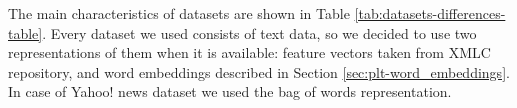 \documentclass{article}
\newcommand{\Algo}[1]{\textsc{#1}}
\newcommand{\data}[3]{
    \begin{tabular}{ll}
    \rule{0pt}{0pt} #1 \\
    \rule{0pt}{0pt} #2 \\
    \rule{0pt}{0pt} #3 \\
    \end{tabular}
}
\newcommand{\databf}[3]{
    \textbf{
	\begin{tabular}{ll}
    \rule{0pt}{0pt} #1 \\
    \rule{0pt}{0pt} #2 \\
    \rule{0pt}{0pt} #3 \\
    \end{tabular}
	}
}
\begin{document}
The main characteristics of datasets are shown in Table \ref{tab:datasets-differences-table}. 
%
Every dataset we used consists of text data, so we decided to use two representations of them when it is available: feature vectors taken from XMLC repository, and word embeddings described in Section \ref{sec:plt-word_embeddings}. In case of Yahoo! news dataset we used the bag of words representation.

\end{document}
